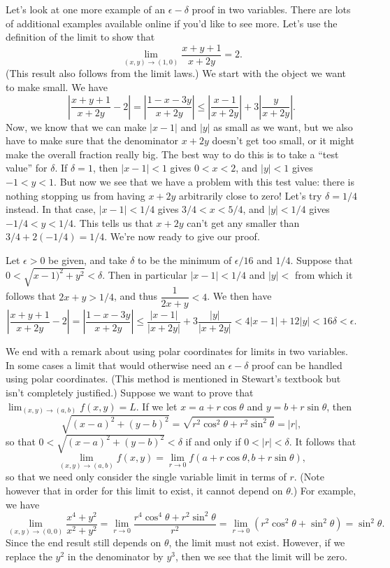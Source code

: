 \documentclass[letterpaper,12pt]{article}
\newcommand{\abs}[1]{\lvert #1\rvert}
\newcommand{\di}{\displaystyle}
\begin{document}
\bigskip

Let's look at one more example of an $\epsilon-\delta$ proof in two variables. There are lots of additional examples available online if you'd like to see more. Let's use the definition of the limit to show that
\[
 \lim_{(x,y)\to (1,0)}\frac{x+y+1}{x+2y} = 2.
\]
(This result also follows from the limit laws.) We start with the object we want to make small. We have
\[
 \left|\frac{x+y+1}{x+2y}-2\right| = \left|\frac{1-x-3y}{x+2y}\right|\leq \left|\frac{x-1}{x+2y}\right|+3\left|\frac{y}{x+2y}\right|.
\]
Now, we know that we can make $\abs{x-1}$ and $\abs{y}$ as small as we want, but we also have to make sure that the denominator $x+2y$ doesn't get too small, or it might make the overall fraction really big. The best way to do this is to take a ``test value'' for $\delta$. If $\delta=1$, then $\abs{x-1}<1$ gives $0<x<2$, and $\abs{y}<1$ gives $-1<y<1$. But now we see that we have a problem with this test value: there is nothing stopping us from having $x+2y$ arbitrarily close to zero! Let's try $\delta = 1/4$ instead. In that case, $\abs{x-1}<1/4$ gives $3/4<x<5/4$, and $\abs{y}<1/4$ gives $-1/4<y<1/4$. This tells us that $x+2y$ can't get any smaller than $3/4+2(-1/4) = 1/4$. We're now ready to give our proof.

\medskip

Let $\epsilon>0$ be given, and take $\delta$ to be the minimum of  $\epsilon/16$  and $1/4$. Suppose that $0<\sqrt{x-1)^2+y^2}<\delta$. Then in particular $\abs{x-1}<1/4$ and $\abs{y}<$ from which it follows that $2x+y>1/4$, and thus $\dfrac{1}{2x+y}<4$. We then have
\[
 \left|\frac{x+y+1}{x+2y}-2\right| = \left|\frac{1-x-3y}{x+2y}\right|\leq \frac{\abs{x-1}}{\abs{x+2y}}+3\frac{\abs{y}}{\abs{x+2y}}<4\abs{x-1}+12\abs{y}<16\delta<\epsilon.
\]

\bigskip

We end with a remark about using polar coordinates for limits in two variables. In some cases a limit that would otherwise need an $\epsilon-\delta$ proof can be handled using polar coordinates. (This method is mentioned in Stewart's textbook but isn't completely justified.) Suppose we want to prove that $\di\lim_{(x,y)\to (a,b)}f(x,y)=L$. If we let $x=a+r\cos\theta$ and $y=b+r\sin\theta$, then 
\[
\sqrt{(x-a)^2+(y-b)^2} = \sqrt{r^2\cos^2\theta+r^2\sin^2\theta} = \abs{r},
\]
so that $0<\sqrt{(x-a)^2+(y-b)^2}<\delta$ if and only if $0<\abs{r}<\delta$. It follows that
\[
\lim_{(x,y)\to (a,b)}f(x,y) = \lim_{r\to 0}f(a+r\cos\theta,b+r\sin\theta),
\]
so that we need only consider the single variable limit in terms of $r$. (Note however that in order for this limit to exist, it cannot depend on $\theta$.) For example, we have
\[
\lim_{(x,y)\to (0,0)}\frac{x^4+y^2}{x^2+y^2} = \lim_{r\to 0}\frac{r^4\cos^4\theta+r^2\sin^2\theta}{r^2} = \lim_{r\to 0}(r^2\cos^2\theta+\sin^2\theta)=\sin^2\theta.
\]
Since the end result still depends on $\theta$, the limit must not exist. However, if we replace the $y^2$ in the denominator by $y^3$, then we see that the limit will be zero.
\end{document}
